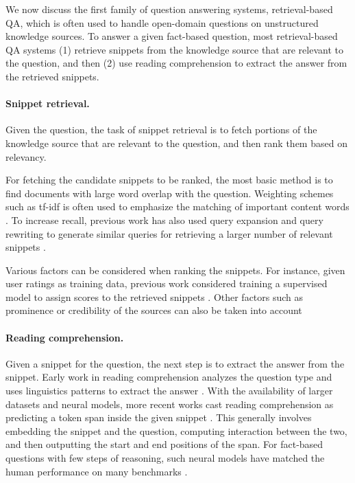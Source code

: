 We now discuss the first family of question answering systems,
retrieval-based QA,
which is often used to handle open-domain questions
on unstructured knowledge sources.
To answer a given fact-based question,
most retrieval-based QA systems
(1) retrieve snippets from the knowledge source
that are relevant to the question,
and then (2) use reading comprehension to extract the answer
from the retrieved snippets.

\paragraph{Snippet retrieval.}
Given the question,
the task of snippet retrieval is to fetch portions of the knowledge source
that are relevant to the question,
and then rank them based on relevancy.

For fetching the candidate snippets to be ranked,
the most basic method is to find documents
with large word overlap with the question.
Weighting schemes such as tf-idf is often used
to emphasize the matching of important content words
\cite{jones1972tfidf,robertson2009probabilistic}.
To increase recall,
previous work has also used query expansion and query rewriting
to generate similar queries for retrieving a larger number
of relevant snippets
\cite{carpineto2012expansion}.

Various factors can be considered when ranking the snippets.
For instance, given user ratings as training data,
previous work considered training a supervised model
to assign scores to the retrieved snippets
\cite{cao2006adapting,yue2007support}.
Other factors such as prominence or credibility of the sources
can also be taken into account
\cite{haveliwala2002topic,gyongyi2004combating}

\paragraph{Reading comprehension.}
Given a snippet for the question,
the next step is to extract the answer from the snippet.
Early work in reading comprehension analyzes the question type
and uses linguistics patterns to extract the answer
\cite{brill2002askmsr,pasca2003open}.
With the availability of larger datasets and neural models,
more recent works cast reading comprehension as
predicting a token span inside the given snippet
\cite{yang2015wikiqa,rajpurkar2016squad,seo2016bidaf}.
This generally involves embedding the snippet and the question,
computing interaction between the two,
and then outputting the start and end positions of the span.
For fact-based questions with few steps of reasoning,
such neural models have matched the human performance
on many benchmarks \cite{chen2016thorough,devlin2018BERT}.

